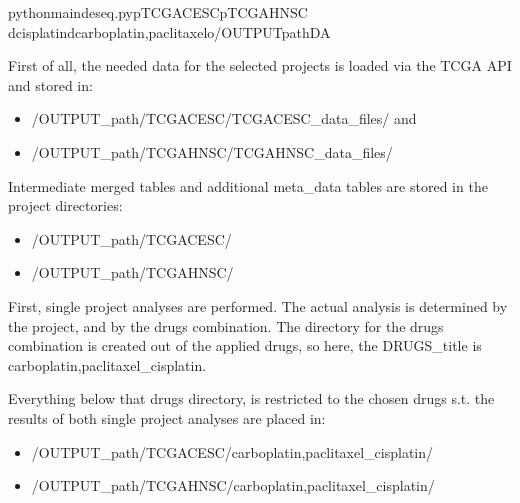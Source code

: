 \documentclass[letterpaper,10pt,english]{sphinxmanual}
\begin{document}
\begin{sphinxVerbatim}[commandchars=\\\{\}]
\PYGZdl{}pythonmain\PYGZus{}deseq.py\PYGZhy{}pTCGA\PYGZhy{}CESC\PYGZhy{}pTCGA\PYGZhy{}HNSC
\PYGZhy{}dcisplatin\PYGZhy{}dcarboplatin,paclitaxel\PYGZhy{}o/OUTPUT\PYGZus{}path\PYGZhy{}D\PYGZhy{}A
\end{sphinxVerbatim}

\sphinxAtStartPar
First of all, the needed data for the selected projects is loaded via the
TCGA API and stored in:
\begin{itemize}
\item {} 
\sphinxAtStartPar
/OUTPUT\_path/TCGA\sphinxhyphen{}CESC/TCGA\sphinxhyphen{}CESC\_data\_files/ and

\item {} 
\sphinxAtStartPar
/OUTPUT\_path/TCGA\sphinxhyphen{}HNSC/TCGA\sphinxhyphen{}HNSC\_data\_files/

\end{itemize}

\sphinxAtStartPar
Intermediate merged tables and additional meta\_data tables are stored in the
project directories:
\begin{itemize}
\item {} 
\sphinxAtStartPar
/OUTPUT\_path/TCGA\sphinxhyphen{}CESC/

\item {} 
\sphinxAtStartPar
/OUTPUT\_path/TCGA\sphinxhyphen{}HNSC/

\end{itemize}

\sphinxAtStartPar
First, single project analyses are performed. The actual analysis is
determined by the project, and by the drugs combination. The directory for
the drugs combination is created out of the applied drugs, so here, the
DRUGS\_title is \textquotesingle{}carboplatin,paclitaxel\_cisplatin\textquotesingle{}.

\sphinxAtStartPar
Everything below that drugs directory, is restricted to the chosen drugs
s.t. the results of both single project analyses are placed in:
\begin{itemize}
\item {} 
\sphinxAtStartPar
/OUTPUT\_path/TCGA\sphinxhyphen{}CESC/carboplatin,paclitaxel\_cisplatin/

\item {} 
\sphinxAtStartPar
/OUTPUT\_path/TCGA\sphinxhyphen{}HNSC/carboplatin,paclitaxel\_cisplatin/

\end{itemize}
\end{document}

